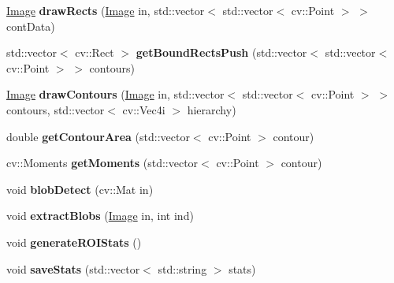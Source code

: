 \begin{DoxyCompactItemize}
\item 
\hyperlink{classImage}{Image} {\bfseries draw\+Rects} (\hyperlink{classImage}{Image} in, std\+::vector$<$ std\+::vector$<$ cv\+::\+Point $>$ $>$ cont\+Data)\hypertarget{classSegmenter_a445cef990fc9d912b591975beb5f5727}{}\label{classSegmenter_a445cef990fc9d912b591975beb5f5727}

\item 
std\+::vector$<$ cv\+::\+Rect $>$ {\bfseries get\+Bound\+Rects\+Push} (std\+::vector$<$ std\+::vector$<$ cv\+::\+Point $>$ $>$ contours)\hypertarget{classSegmenter_ac062fd10b08b8a7abe5e5e589e2b957f}{}\label{classSegmenter_ac062fd10b08b8a7abe5e5e589e2b957f}

\item 
\hyperlink{classImage}{Image} {\bfseries draw\+Contours} (\hyperlink{classImage}{Image} in, std\+::vector$<$ std\+::vector$<$ cv\+::\+Point $>$ $>$ contours, std\+::vector$<$ cv\+::\+Vec4i $>$ hierarchy)\hypertarget{classSegmenter_a58437eb1ba1c10ccee8f5fc838418a1f}{}\label{classSegmenter_a58437eb1ba1c10ccee8f5fc838418a1f}

\item 
double {\bfseries get\+Contour\+Area} (std\+::vector$<$ cv\+::\+Point $>$ contour)\hypertarget{classSegmenter_a47fdf2fb9233b48afc1fee0fe22c5cff}{}\label{classSegmenter_a47fdf2fb9233b48afc1fee0fe22c5cff}

\item 
cv\+::\+Moments {\bfseries get\+Moments} (std\+::vector$<$ cv\+::\+Point $>$ contour)\hypertarget{classSegmenter_ab0e8c2520946c9dd4ba4273a22cf545a}{}\label{classSegmenter_ab0e8c2520946c9dd4ba4273a22cf545a}

\item 
void {\bfseries blob\+Detect} (cv\+::\+Mat in)\hypertarget{classSegmenter_a1c28682631d90f7ada2f1f841952e801}{}\label{classSegmenter_a1c28682631d90f7ada2f1f841952e801}

\item 
void {\bfseries extract\+Blobs} (\hyperlink{classImage}{Image} in, int ind)\hypertarget{classSegmenter_a657c09adbb7d6edcbb58239b9d8db006}{}\label{classSegmenter_a657c09adbb7d6edcbb58239b9d8db006}

\item 
void {\bfseries generate\+R\+O\+I\+Stats} ()\hypertarget{classSegmenter_a1a20c2c950b263f9c263ec483c3c2657}{}\label{classSegmenter_a1a20c2c950b263f9c263ec483c3c2657}

\item 
void {\bfseries save\+Stats} (std\+::vector$<$ std\+::string $>$ stats)\hypertarget{classSegmenter_a00a11f9e084e9f02a58f1a50df6e527c}{}\label{classSegmenter_a00a11f9e084e9f02a58f1a50df6e527c}


\end{DoxyCompactItemize}
